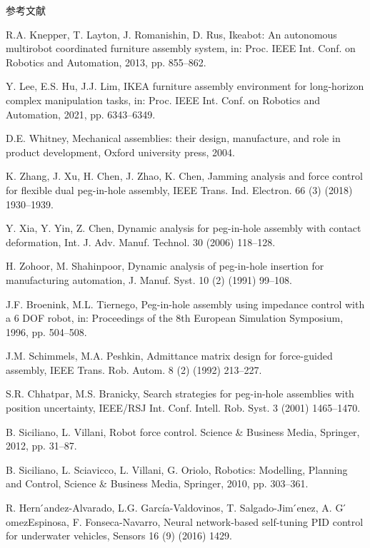 \documentclass{Diploma}
\begin{document}
\begin{center}
参考文献
\end{center}
\begin{reflist}
  \item R.A. Knepper, T. Layton, J. Romanishin, D. Rus, Ikeabot: An autonomous multirobot coordinated furniture assembly system, in: Proc. IEEE Int. Conf. on Robotics and Automation, 2013, pp. 855–862.
  \item Y. Lee, E.S. Hu, J.J. Lim, IKEA furniture assembly environment for long-horizon complex manipulation tasks, in: Proc. IEEE Int. Conf. on Robotics and Automation, 2021, pp. 6343–6349.
  \item D.E. Whitney, Mechanical assemblies: their design, manufacture, and role in product development, Oxford university press, 2004. 
  \item K. Zhang, J. Xu, H. Chen, J. Zhao, K. Chen, Jamming analysis and force control for flexible dual peg-in-hole assembly, IEEE Trans. Ind. Electron. 66 (3) (2018) 1930–1939. 
  \item Y. Xia, Y. Yin, Z. Chen, Dynamic analysis for peg-in-hole assembly with contact deformation, Int. J. Adv. Manuf. Technol. 30 (2006) 118–128. 
  \item H. Zohoor, M. Shahinpoor, Dynamic analysis of peg-in-hole insertion for manufacturing automation, J. Manuf. Syst. 10 (2) (1991) 99–108. 
  \item J.F. Broenink, M.L. Tiernego, Peg-in-hole assembly using impedance control with a 6 DOF robot, in: Proceedings of the 8th European Simulation Symposium, 1996, pp. 504–508. 
  \item J.M. Schimmels, M.A. Peshkin, Admittance matrix design for force-guided assembly, IEEE Trans. Rob. Autom. 8 (2) (1992) 213–227. 
  \item S.R. Chhatpar, M.S. Branicky, Search strategies for peg-in-hole assemblies with position uncertainty, IEEE/RSJ Int. Conf. Intell. Rob. Syst. 3 (2001) 1465–1470. 
  \item  B. Siciliano, L. Villani, Robot force control. Science \& Business Media, Springer, 2012, pp. 31–87. 
  \item  B. Siciliano, L. Sciavicco, L. Villani, G. Oriolo, Robotics: Modelling, Planning and Control, Science \& Business Media, Springer, 2010, pp. 303–361. 
  \item  R. Hern ́andez-Alvarado, L.G. García-Valdovinos, T. Salgado-Jim ́enez, A. G ́ omezEspinosa, F. Fonseca-Navarro, Neural network-based self-tuning PID control for underwater vehicles, Sensors 16 (9) (2016) 1429. 

\end{reflist}
\end{document}
